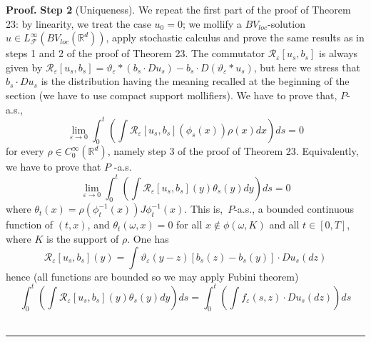 \documentclass[a4paper,11pt]{article}
\newenvironment{proof}[1][Proof]{\textbf{#1.} }{\ \rule{0.5em}{0.5em}}
\begin{document}
\begin{proof}
\textbf{Step 2} (Uniqueness). We repeat the first part of the proof of
Theorem 23: by linearity, we treat the case $u_{0}=0$; we mollify a $BV_{loc}
$-solution $u\in L_{\mathcal{F}}^{\infty }\left( BV_{loc}\left( \mathbb{R}%
^{d}\right) \right) $, apply stochastic calculus and prove the same results
as in steps 1 and 2 of the proof of Theorem 23. The commutator $\mathcal{R}%
_{\varepsilon }\left[ u_{s},b_{s}\right] $ is always given by $\mathcal{R}%
_{\varepsilon }\left[ u_{s},b_{s}\right] =\vartheta _{\varepsilon }\ast
\left( b_{s}\cdot Du_{s}\right) -b_{s}\cdot D\left( \vartheta _{\varepsilon
}\ast u_{s}\right) $, but here we stress that $b_{s}\cdot Du_{s}$ is the
distribution having the meaning recalled at the beginning of the section (we
have to use compact support mollifiers). We have to prove that, $P$-a.s.,
\begin{equation*}
\lim_{\varepsilon \rightarrow 0}\int_{0}^{t}\left( \int \mathcal{R}%
_{\varepsilon }\left[ u_{s},b_{s}\right] \left( \phi _{s}\left( x\right)
\right) \rho \left( x\right) dx\right) ds=0
\end{equation*}
for every $\rho \in C_{0}^{\infty }\left( \mathbb{R}^{d}\right) $, namely
step 3 of the proof of Theorem 23. Equivalently, we have to prove that $P$%
-a.s.
\begin{equation*}
\lim_{\varepsilon \rightarrow 0}\int_{0}^{t}\left( \int \mathcal{R}%
_{\varepsilon }\left[ u_{s},b_{s}\right] \left( y\right) \theta _{s}\left(
y\right) dy\right) ds=0
\end{equation*}
where $\theta _{t}\left( x\right) =\rho \left( \phi _{t}^{-1}\left(
x\right) \right) J\phi _{t}^{-1}\left( x\right) $. This is,\ $P$-a.s., a
bounded continuous function of $\left( t,x\right) $, and $\theta _{t}\left(
\omega ,x\right) =0$ for all $x\notin \phi \left( \omega ,K\right) $ and all
$t\in \left[ 0,T\right] $, where $K$ is the support of $\rho $. One has
\begin{equation*}
\mathcal{R}_{\varepsilon }\left[ u_{s},b_{s}\right] \left( y\right) =\int
\vartheta _{\varepsilon }\left( y-z\right) \left[ b_{s}\left( z\right)
-b_{s}\left( y\right) \right] \cdot Du_{s}\left( dz\right)
\end{equation*}
hence (all functions are bounded so we may apply Fubini theorem)
\begin{equation*}
\int_{0}^{t}\left( \int \mathcal{R}_{\varepsilon }\left[ u_{s},b_{s}\right]
\left( y\right) \theta _{s}\left( y\right) dy\right) ds=\int_{0}^{t}\left(
\int f_{\varepsilon }\left( s,z\right) \cdot Du_{s}\left( dz\right) \right)
ds

\end{equation*}
\end{proof}
\end{document}
